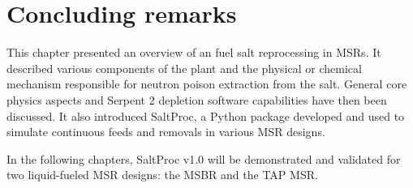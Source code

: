 \section{Concluding remarks}
This chapter presented an overview of an fuel salt reprocessing in 
\glspl{MSR}. It described various components of the plant and the physical 
or chemical mechanism responsible for neutron poison extraction from the 
salt. General core physics aspects and Serpent 2 depletion software 
capabilities have then been discussed. It also introduced SaltProc, a Python 
package developed and used to simulate continuous feeds and removals in 
various \gls{MSR} designs.

In the following chapters, SaltProc v1.0 will be demonstrated and validated 
for two liquid-fueled \gls{MSR} designs: the \gls{MSBR} and the \gls{TAP} 
\gls{MSR}.